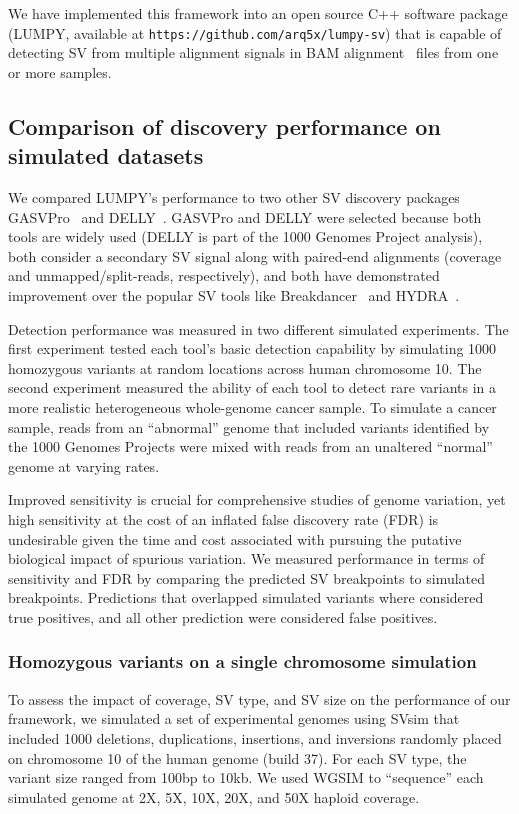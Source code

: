 \documentclass[10pt]{bmc_article}
\newenvironment{bmcformat}{\begin{raggedright}\baselineskip20pt\sloppy\setboolean{publ}{false}}{\end{raggedright}\baselineskip20pt\sloppy}
\begin{document}
\begin{bmcformat}
We have implemented this framework into an open source C++ software package
(LUMPY, available at {\tt https://github.com/arq5x/lumpy-sv})
that is capable of detecting SV from multiple alignment signals in BAM
alignment~\cite{li2009b} files from one or more samples. 

\subsection*{Comparison of discovery performance on simulated datasets}

We compared LUMPY’s performance to two other SV discovery packages
GASVPro~\cite{sindi2012} and DELLY~\cite{rausch2012b}.  GASVPro and DELLY were
selected because both tools are widely used (DELLY is part of the 1000 Genomes
Project analysis), both consider a secondary SV signal along with paired-end
alignments (coverage and unmapped/split-reads, respectively), and both have
demonstrated improvement over the popular SV tools like
Breakdancer~\cite{chen2009} and HYDRA~\cite{quinlan2010b}. 

Detection performance was measured in two different simulated experiments.  The
first experiment tested each tool's basic detection capability by simulating
1000 homozygous variants at random locations across human chromosome 10.  The
second experiment measured the ability of each tool to detect rare variants in
a more realistic heterogeneous whole-genome cancer sample.  To simulate a
cancer sample, reads from an ``abnormal'' genome that included variants
identified by the 1000 Genomes Projects were mixed with reads from an unaltered
``normal'' genome at varying rates.

Improved sensitivity is crucial for comprehensive studies of genome variation,
yet high sensitivity at the cost of an inflated false discovery rate (FDR) is
undesirable given the time and cost associated with pursuing the putative
biological impact of spurious variation.  We measured performance in terms of
sensitivity and FDR by comparing the predicted SV breakpoints to simulated
breakpoints.  Predictions that overlapped simulated variants where considered
true positives, and all other prediction were considered false positives.

\subsubsection*{Homozygous variants on a single chromosome simulation}

To assess the impact of coverage, SV type, and SV size on the performance of
our framework, we simulated a set of experimental genomes using SVsim that
included 1000 deletions, duplications, insertions, and inversions randomly
placed on chromosome 10 of the human genome (build 37).  For each SV type, 
the variant size ranged from 100bp to 10kb.  We used WGSIM to ``sequence'' each
simulated genome at 2X, 5X, 10X, 20X, and 50X haploid coverage.  


\end{bmcformat}
\end{document}
